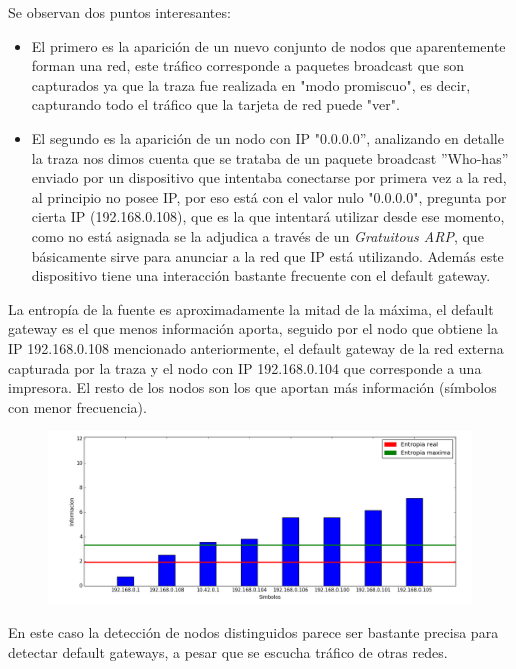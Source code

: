 Se observan dos puntos interesantes:
 \begin{itemize}
 	\item El primero es la aparición de un nuevo conjunto de nodos que aparentemente forman una red, este tráfico corresponde a paquetes broadcast que son capturados ya que la traza fue realizada en "modo promiscuo", es decir, capturando todo el tráfico que la tarjeta de red puede "ver".
 \item El segundo es la aparición de un nodo con IP "0.0.0.0'', analizando en detalle la traza nos dimos cuenta que se trataba de un paquete broadcast ''Who-has'' enviado por un dispositivo que intentaba conectarse por primera vez a la red, al principio no posee IP, por eso está con el valor nulo "0.0.0.0", pregunta por cierta IP (192.168.0.108), que es la que intentará utilizar desde ese momento, como no está asignada se la adjudica a través de un \textit{Gratuitous ARP}, que básicamente sirve para anunciar a la red que IP está utilizando. Además este dispositivo tiene una interacción bastante frecuente con el default gateway.
 \end{itemize}
 
La entropía de la fuente es aproximadamente la mitad de la  máxima, el default gateway es el que menos información aporta, seguido por el nodo que obtiene la IP 192.168.0.108 mencionado anteriormente, el default gateway de la red externa capturada por la traza y el nodo con IP 192.168.0.104 que corresponde a una impresora. El resto de los nodos son los que aportan más información (símbolos con menor frecuencia).

\begin{figure}[H]
\centering
\includegraphics[width=0.8\linewidth]{imagenes/red-dom-S1}
\caption{}
\label{fig:red-dom-S1}
\end{figure}

En este caso la detección de nodos distinguidos parece ser bastante precisa para detectar default gateways, a pesar que se escucha tráfico de otras redes.